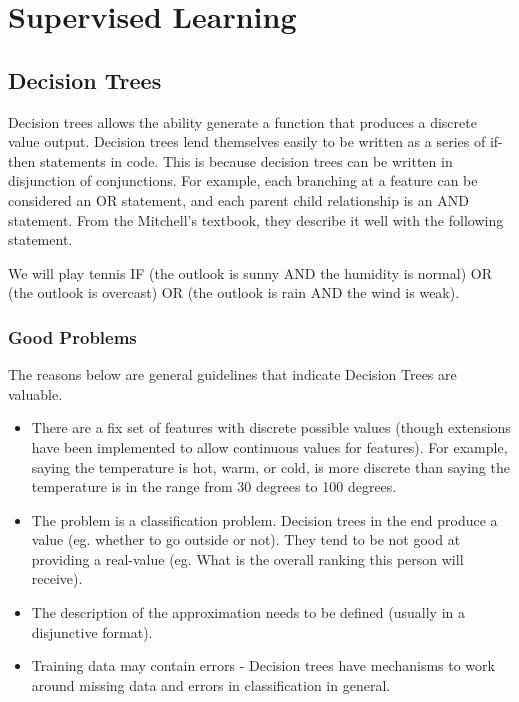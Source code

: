 \documentclass[titlepage,11pt]{article}
\begin{document}
\section{Supervised Learning}

\subsection{Decision Trees}

Decision trees allows the ability generate a function that produces a discrete value output. Decision trees lend themselves easily to be written as a series of if-then statements in code. This is because decision trees can be written in disjunction of conjunctions. For example, each branching at a feature can be considered an OR statement, and each parent child relationship is an AND statement. From the Mitchell's textbook, they describe it well with the following statement.

We will play tennis IF (the outlook is sunny AND the humidity is normal) OR (the outlook is overcast) OR (the outlook is rain AND the wind is weak).

\subsubsection{Good Problems}

The reasons below are general guidelines that indicate Decision Trees are valuable. 

\begin{itemize}
\item There are a fix set of features with discrete possible values (though extensions have been implemented to allow continuous values for features). For example, saying the temperature is hot, warm, or cold, is more discrete than saying the temperature is in the range from 30 degrees to 100 degrees.
\item The problem is a classification problem. Decision trees in the end produce a value (eg. whether to go outside or not). They tend to be not good at providing a real-value (eg. What is the overall ranking this person will receive).
\item The description of the approximation needs to be defined (usually in a disjunctive format).
\item Training data may contain errors - Decision trees have mechanisms to work around missing data and errors in classification in general.
\end{itemize}
\end{document}
